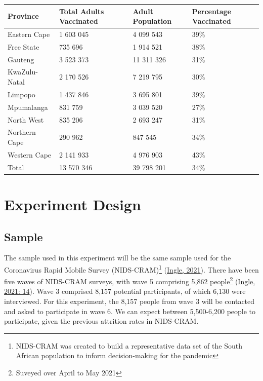 \documentclass[11pt,preprint, authoryear]{elsarticle}
\let\origtable\table
\let\endorigtable\endtable
\renewenvironment{table}[1][2] {
    \expandafter\origtable\expandafter[H]
} {
    \endorigtable
}
\numberwithin{equation}{section}
\numberwithin{figure}{section}
\numberwithin{table}{section}
\let\rmarkdownfootnote\footnote%
\def\footnote{\protect\rmarkdownfootnote}
\begin{document}
\begin{table}[H]
\centering
\begin{tabular}{llll}
  \toprule
Province & Total Adults Vaccinated & Adult Population & Percentage Vaccinated \\ 
  \midrule
Eastern Cape & 1 603 045 & 4 099 543 & 39\% \\ 
  Free State & 735 696 & 1 914 521 & 38\% \\ 
  Gauteng & 3 523 373 & 11 311 326 & 31\% \\ 
  KwaZulu-Natal & 2 170 526 & 7 219 795 & 30\% \\ 
  Limpopo & 1 437 846 & 3 695 801 & 39\% \\ 
  Mpumalanga & 831 759 & 3 039 520 & 27\% \\ 
  North West & 835 206 & 2 693 247 & 31\% \\ 
  Northern Cape & 290 962 & 847 545 & 34\% \\ 
  Western Cape & 2 141 933 & 4 976 903 & 43\% \\ 
  Total & 13 570 346 & 39 798 201 & 34\% \\ 
   \bottomrule
\end{tabular}
\caption{Vaccination Statistics \label{tab1}} 
\end{table}

\hypertarget{experiment-design}{%
\section{\texorpdfstring{Experiment Design
\label{design}}{Experiment Design }}\label{experiment-design}}

\hypertarget{sample}{%
\subsection{Sample}\label{sample}}

The sample used in this experiment will be the same sample used for the
Coronavirus Rapid Mobile Survey (NIDS-CRAM)\footnote{NIDS-CRAM was
  created to build a representative data set of the South African
  population to inform decision-making for the pandemic}
(\protect\hyperlink{ref-nids}{Ingle, 2021}). There have been five waves
of NIDS-CRAM surveys, with wave 5 comprising 5,862 people\footnote{Suveyed
  over April to May 2021} (\protect\hyperlink{ref-nids}{Ingle, 2021:
14}). Wave 3 comprised 8,157 potential participants, of which 6,130 were
interviewed. For this experiment, the 8,157 people from wave 3 will be
contacted and asked to participate in wave 6. We can expect between
5,500-6,200 people to participate, given the previous attrition rates in
NIDS-CRAM.
\end{document}
